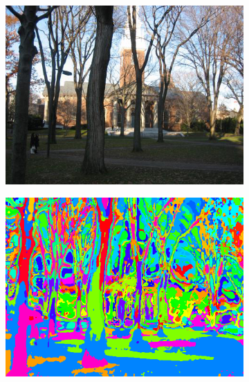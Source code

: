 \documentclass[11pt]{article}
\begin{document}
\begin{figure}[h!]
  \center
  \begin{subfigure}{0.4\linewidth}
    \centering
    \includegraphics[width=\textwidth]{../results/labelme_brrdxeoavpkqjzs_image.png}
  \end{subfigure}
  \begin{subfigure}{0.4\linewidth}
    \centering
    \includegraphics[width=\textwidth]{../results/labelme_brrdxeoavpkqjzs_wordmap.png}
  \end{subfigure}


\end{figure}
\end{document}
